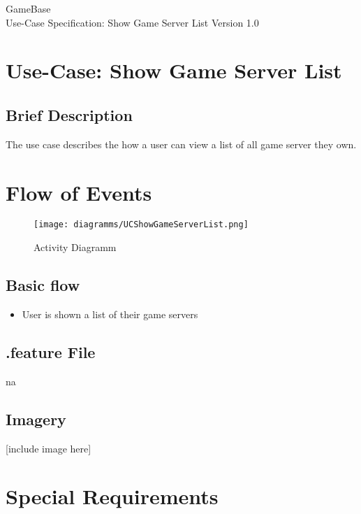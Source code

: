 \documentclass[a4paper,12pt,chapterprefix=false,bibliography=totoc,listof=totoc,book]{scrreprt}
\begin{document}
    \begin{flushright}
        GameBase
        \\
        Use-Case Specification: Show Game Server List
        \bigbreak
        Version 1.0
    \end{flushright}

    \tableofcontents

    \chapter{Use-Case: Show Game Server List}

    \section{Brief Description}
    The use case describes the how a user can view a list of all game server they own.

    \chapter{Flow of Events}
    \begin{figure}[H]
        \texttt{[image: diagramms/UCShowGameServerList.png]}
        \caption{Activity Diagramm}
        \label{fig:ucd}
    \end{figure}
    \section{Basic flow}

    \begin{itemize}
        \item User is shown a list of their game servers
    \end{itemize}

    \section{.feature File}
    \gls{na}

    \section{Imagery}
    [include image here]

    \chapter{Special Requirements}
\end{document}
